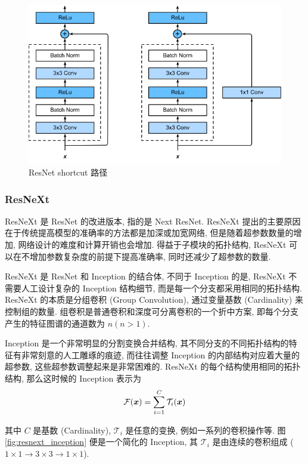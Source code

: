 \documentclass[12pt]{article}
\begin{document}
\begin{figure}[htbp]
  \centering
  \includegraphics[width=12cm]{resnet_shortcut.png}
  \caption{ResNet shortcut 路径}
  \label{fig:resnet_shortcut}
\end{figure}

\subsubsection{ResNeXt}


ResNeXt \cite{Xie2017Aggregated} 是 ResNet 的改进版本, 指的是 Next ResNet. ResNeXt 提出的主要原因在于传统提高模型的准确率的方法都是加深或加宽网络, 但是随着超参数数量的增加, 网络设计的难度和计算开销也会增加. 得益于子模块的拓扑结构, ResNeXt 可以在不增加参数复杂度的前提下提高准确率, 同时还减少了超参数的数量. 

ResNeXt 是 ResNet 和 Inception 的结合体, 不同于 Inception 的是, ResNeXt 不需要人工设计复杂的 Inception 结构细节, 而是每一个分支都采用相同的拓扑结构. ResNeXt 的本质是分组卷积 (Group Convolution), 通过变量基数 (Cardinality) 来控制组的数量. 组卷积是普通卷积和深度可分离卷积的一个折中方案, 即每个分支产生的特征图谱的通道数为 $n(n>1)$.

Inception 是一个非常明显的分割变换合并结构, 其不同分支的不同拓扑结构的特征有非常刻意的人工雕琢的痕迹, 而往往调整 Inception 的内部结构对应着大量的超参数, 这些超参数调整起来是非常困难的. ResNeXt 的每个结构使用相同的拓扑结构, 那么这时候的 Inception 表示为
\begin{equation}
  \mathcal{F}(\bm{x})=\sum_{i=1}^C\mathcal{T}_i(\bm{x})
\end{equation}

其中 $C$ 是基数 (Cardinality),  $\mathcal{T}_i$ 是任意的变换, 例如一系列的卷积操作等. 图 \ref{fig:resnext_inception} 便是一个简化的 Inception, 其 $\mathcal{T}_i$ 是由连续的卷积组成 ($1\times1\to3\times3\to1\times1$).
\end{document}
